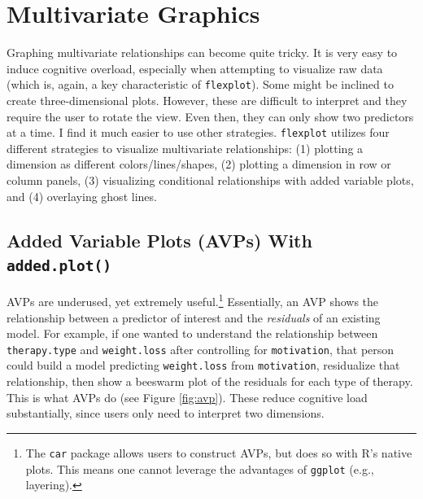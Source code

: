 \documentclass[
  man]{apa6}
\begin{document}
\normalsize

\hypertarget{multivariate-graphics}{%
\section{Multivariate Graphics}\label{multivariate-graphics}}

Graphing multivariate relationships can become quite tricky. It is very easy to induce cognitive overload, especially when attempting to visualize raw data (which is, again, a key characteristic of \texttt{flexplot}). Some might be inclined to create three-dimensional plots. However, these are difficult to interpret and they require the user to rotate the view. Even then, they can only show two predictors at a time. I find it much easier to use other strategies. \texttt{flexplot} utilizes four different strategies to visualize multivariate relationships: (1) plotting a dimension as different colors/lines/shapes, (2) plotting a dimension in row or column panels, (3) visualizing conditional relationships with added variable plots, and (4) overlaying ghost lines.

\hypertarget{added-variable-plots-avps-with-added.plot}{%
\subsection{\texorpdfstring{Added Variable Plots (AVPs) With \texttt{added.plot()}}{Added Variable Plots (AVPs) With added.plot()}}\label{added-variable-plots-avps-with-added.plot}}

AVPs are underused, yet extremely useful.\footnote{The \texttt{car} package allows users to construct AVPs, but does so with R's native plots. This means one cannot leverage the advantages of \texttt{ggplot} (e.g., layering).} Essentially, an AVP shows the relationship between a predictor of interest and the \emph{residuals} of an existing model. For example, if one wanted to understand the relationship between \texttt{therapy.type} and \texttt{weight.loss} after controlling for \texttt{motivation}, that person could build a model predicting \texttt{weight.loss} from \texttt{motivation}, residualize that relationship, then show a beeswarm plot of the residuals for each type of therapy. This is what AVPs do (see Figure \ref{fig:avp}). These reduce cognitive load substantially, since users only need to interpret two dimensions.
\end{document}
